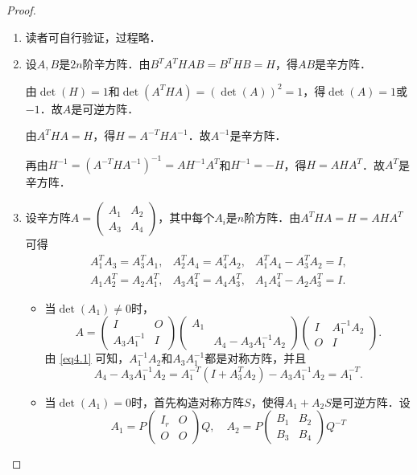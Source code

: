 \documentclass[a4paper,fontset=windows]{ctexbook}
\theoremstyle{definition}
\begin{document}
\begin{proof}~
\begin{enumerate}
\item 读者可自行验证，过程略．

\item 设$A,B$是$2n$阶辛方阵．由$B^TA^THAB=B^THB=H$，得$AB$是辛方阵．

由$\det(H)=1$和$\det(A^THA)=(\det(A))^2=1$，得$\det(A)=1$或$-1$．故$A$是可逆方阵．

由$A^THA=H$，得$H=A^{-T}HA^{-1}$．故$A^{-1}$是辛方阵．

再由$H^{-1}=(A^{-T}HA^{-1})^{-1}=AH^{-1}A^T$和$H^{-1}=-H$，得$H=AHA^T$．故$A^T$是辛方阵．

\item 设辛方阵$A=\begin{pmatrix}A_1&A_2 \\ A_3&A_4\end{pmatrix}$，其中每个$A_i$是$n$阶方阵．由$A^THA=H=AHA^T$可得
\begin{equation}
\begin{array}{ccc}
A_1^TA_3=A_3^TA_1,&A_2^TA_4=A_4^TA_2,&A_1^TA_4-A_3^TA_2=I, \\
A_1A_2^T=A_2A_1^T,&A_3A_4^T=A_4A_3^T,&A_1A_4^T-A_2A_3^T=I.
\end{array}\label{eq4.1}
\end{equation}
\begin{itemize}
\item 当$\det(A_1)\ne 0$时，
$$A=\begin{pmatrix}I&O \\ A_3A_1^{-1}&I\end{pmatrix}\begin{pmatrix}A_1& \\ &A_4-A_3A_1^{-1}A_2\end{pmatrix}\begin{pmatrix}I&A_1^{-1}A_2 \\ O&I\end{pmatrix}.$$
由 \eqref{eq4.1} 可知，$A_1^{-1}A_2$和$A_3A_1^{-1}$都是对称方阵，并且
$$A_4-A_3A_1^{-1}A_2=A_1^{-T}(I+A_3^TA_2)-A_3A_1^{-1}A_2=A_1^{-T}.$$
\item 当$\det(A_1)=0$时，首先构造对称方阵$S$，使得$A_1+A_2S$是可逆方阵．设
$$A_1=P\begin{pmatrix}I_r&O \\ O&O\end{pmatrix}Q,\quad A_2=P\begin{pmatrix}B_1&B_2 \\ B_3&B_4\end{pmatrix}Q^{-T}$$

\end{itemize}
\end{enumerate}
\end{proof}
\end{document}
